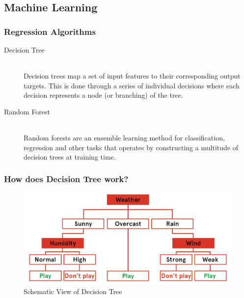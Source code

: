 \documentclass{beamer}
\begin{document}
\subsection{Machine Learning}
\begin{frame}
	\frametitle{Regression Algorithms}
    \begin{description}
        \item[Decision Tree] \hfill \\ Decision trees map a set of input features to their corresponding output targets. This is done through a series of individual decisions where each decision represents a node (or branching) of the tree. 
        \\[0.2in]
        \pause
        \item[Random Forest] \hfill \\ Random forests are an ensemble learning method for classification, regression and other tasks that operates by constructing a multitude of decision trees at training time. 
    \end{description}
    \end{frame}
\begin{frame}
	\frametitle{How does Decision Tree work?}
    \begin{figure}
        \includegraphics[scale=0.15]{img/decision_tree2.png}
        \caption*{Schematic View of Decision Tree}
    \end{figure}
    \end{frame}
\end{document}
